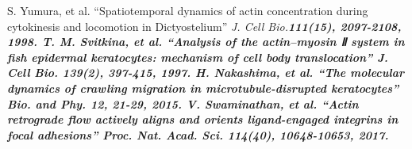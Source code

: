 \documentclass[10pt,twocolumn,a4j]{jarticle}
\begin{document}

\begin{thebibliography}{9}
  S. Yumura, et al.
    ``Spatiotemporal dynamics of actin concentration during cytokinesis and locomotion in Dictyostelium''  \sl{J. Cell Bio.}\bf{111}\rm{(15)}, 2097-2108, 1998.
      T. M. Svitkina, et al.
    ``Analysis of the actin--myosin Ⅱ system in fish epidermal keratocytes: mechanism of cell body translocation''  \sl{J. Cell Bio.} \bf{139}\rm{(2)}, 397-415, 1997.
   H. Nakashima, et al.
    ``The molecular dynamics of crawling migration in microtubule-disrupted keratocytes''  \sl{Bio. and Phy.} \bf{12}\rm{}, 21-29, 2015.
        V. Swaminathan, et al.
    ``Actin retrograde flow actively aligns and orients ligand-engaged integrins in focal adhesions''  \sl{Proc. Nat. Acad. Sci.} \bf{114}\rm{(40)}, 10648-10653, 2017.
\end{thebibliography}
\end{document}
